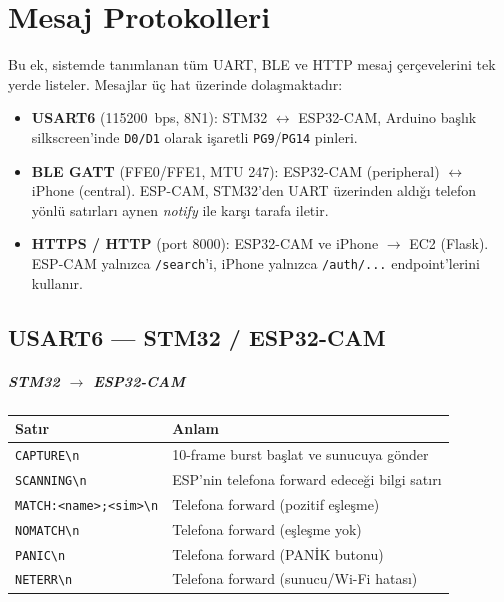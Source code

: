 \chapter{Mesaj Protokolleri}
\label{app:protokol}

Bu ek, sistemde tanımlanan tüm UART, BLE ve HTTP mesaj çerçevelerini
tek yerde listeler. Mesajlar üç hat üzerinde dolaşmaktadır:

\begin{itemize}
    \item \textbf{USART6} (115200~bps, 8N1): STM32 $\leftrightarrow$ ESP32-CAM,
          Arduino başlık silkscreen'inde \texttt{D0/D1} olarak işaretli
          \texttt{PG9}/\texttt{PG14} pinleri.
    \item \textbf{BLE GATT} (FFE0/FFE1, MTU 247): ESP32-CAM (peripheral)
          $\leftrightarrow$ iPhone (central). ESP-CAM, STM32'den UART
          üzerinden aldığı telefon yönlü satırları aynen \emph{notify}
          ile karşı tarafa iletir.
    \item \textbf{HTTPS / HTTP} (port 8000): ESP32-CAM ve iPhone
          $\rightarrow$ EC2 (Flask). ESP-CAM yalnızca \texttt{/search}'i,
          iPhone yalnızca \texttt{/auth/...} endpoint'lerini kullanır.
\end{itemize}

\section{USART6 --- STM32 / ESP32-CAM}

\paragraph{STM32 $\rightarrow$ ESP32-CAM}

\begin{tabular}{l l}
\toprule
\textbf{Satır}                              & \textbf{Anlam}\\
\midrule
\texttt{CAPTURE\textbackslash n}            & 10-frame burst başlat ve sunucuya gönder\\
\texttt{SCANNING\textbackslash n}           & ESP'nin telefona forward edeceği bilgi satırı\\
\texttt{MATCH:<name>;<sim>\textbackslash n} & Telefona forward (pozitif eşleşme)\\
\texttt{NOMATCH\textbackslash n}            & Telefona forward (eşleşme yok)\\
\texttt{PANIC\textbackslash n}              & Telefona forward (PANİK butonu)\\
\texttt{NETERR\textbackslash n}             & Telefona forward (sunucu/Wi-Fi hatası)\\
\bottomrule
\end{tabular}

